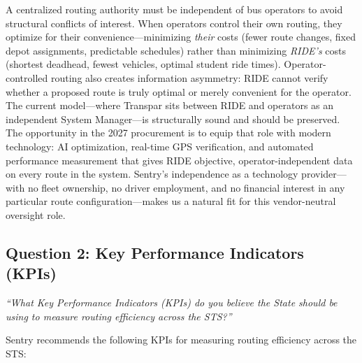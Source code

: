 \begin{description}[style=nextline, leftmargin=0.5cm]
    \item[\faIcon{shield-alt} \textbf{Vendor-Neutral Oversight:}] A centralized routing authority must be independent of bus operators to avoid structural conflicts of interest. When operators control their own routing, they optimize for their convenience---minimizing \textit{their} costs (fewer route changes, fixed depot assignments, predictable schedules) rather than minimizing \textit{RIDE's} costs (shortest deadhead, fewest vehicles, optimal student ride times). Operator-controlled routing also creates information asymmetry: RIDE cannot verify whether a proposed route is truly optimal or merely convenient for the operator. The current model---where Transpar sits between RIDE and operators as an independent System Manager---is structurally sound and should be preserved. The opportunity in the 2027 procurement is to equip that role with modern technology: AI optimization, real-time GPS verification, and automated performance measurement that gives RIDE objective, operator-independent data on every route in the system. Sentry's independence as a technology provider---with no fleet ownership, no driver employment, and no financial interest in any particular route configuration---makes us a natural fit for this vendor-neutral oversight role.
\end{description}


\subsection{Question 2: Key Performance Indicators (KPIs)}
\textit{``What Key Performance Indicators (KPIs) do you believe the State should be using to measure routing efficiency across the STS?''}

\vspace{0.3cm}

Sentry recommends the following KPIs for measuring routing efficiency across the STS:

\vspace{0.3cm}

